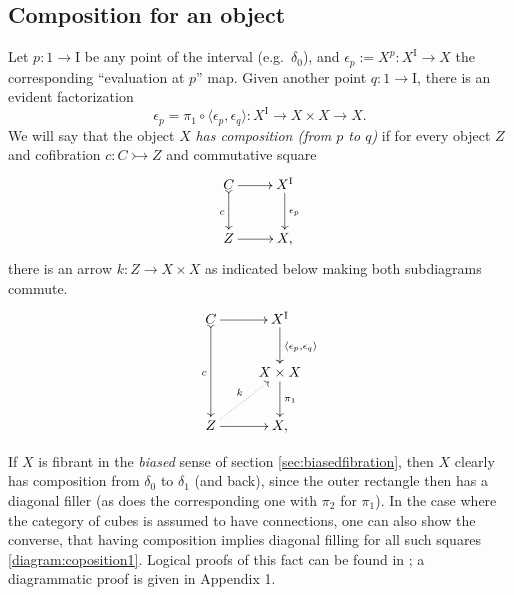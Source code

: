 \documentclass[11pt]{article}
\newcommand{\mono}{\ensuremath{\rightarrowtail}}
\newcommand{\ra}{\ensuremath{\rightarrow}}
\newcommand{\I}{\ensuremath{\mathrm{I}}}
\theoremstyle{remark}
\theoremstyle{definition}
\begin{document}
\subsection{Composition for an object}

Let $p : 1 \ra \I$ be any point of the interval (e.g.\ $\delta_0$), and $\epsilon_p := X^p : X^\I \to X$ the corresponding ``evaluation at $p$'' map.  Given another point $q : 1 \to \I$, there is an evident factorization 
\[
\epsilon_p = \pi_1 \circ \langle \epsilon_p, \epsilon_q\rangle : X^\I \to X\times X \to X.
\]
We will say that the object $X$ \emph{has composition (from $p$ to $q$)} if for every object $Z$ and cofibration $c:C\mono Z$ and commutative square 
\begin{equation}\label{diagram:composition1}
\xymatrix{
C \ar@{>->}[d]_{c} \ar[r]  & X^\I \ar[d]^{\epsilon_p} \\
Z \ar[r] & X,
}
\end{equation}
there is an arrow $k : Z \to X\times X$ as indicated below making both subdiagrams commute.
\begin{equation}\label{diagram:composition2}
\xymatrix{
C \ar@{>->}[dd]_{c} \ar[r]  & X^\I \ar[d]^{\langle \epsilon_p, \epsilon_q\rangle} \\
& X\times X \ar[d]^{\pi_1} \\
Z \ar[r] \ar@{..>}[ru]^{k} & X,
}
\end{equation}

If $X$ is fibrant in the \emph{biased} sense of section \ref{sec:biasedfibration}, then $X$ clearly has composition from $\delta_0$ to $\delta_1$ (and back), since the outer rectangle then has a diagonal filler (as does the corresponding one with $\pi_2$ for $\pi_1$).   In the case where the category of cubes is assumed to have connections, one can also show the converse, that having composition implies diagonal filling for all such squares \eqref{diagram:coposition1}.  Logical proofs of this fact can be found in \cite{CCHM,OP}; a diagrammatic proof is given in Appendix 1.
\end{document}
